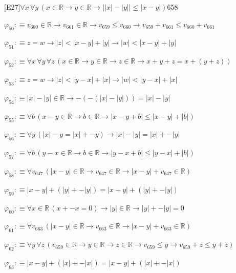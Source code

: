 \begin{fullproof}{[E27]}{$\forall x\,\forall y\,(x \in \mathbb{R} \to y \in \mathbb{R} \to \lvert \lvert x \rvert - \lvert y \rvert \rvert \leq \lvert x - y \rvert)$}{658}
\begin{abbrevlist}
\item $\varphi_{50} :\equiv v_{660} \in \mathbb{R} \to v_{661} \in \mathbb{R} \to v_{659} \leq v_{660} \to v_{659} + v_{661} \leq v_{660} + v_{661}$
\item $\varphi_{51} :\equiv z = w \to \lvert z \rvert < \lvert x - y \rvert + \lvert y \rvert \to \lvert w \rvert < \lvert x - y \rvert + \lvert y \rvert$
\item $\varphi_{52} :\equiv \forall x\,\forall y\,\forall z\,(x \in \mathbb{R} \to y \in \mathbb{R} \to z \in \mathbb{R} \to x + y + z = x + (y + z))$
\item $\varphi_{53} :\equiv z = w \to \lvert z \rvert < \lvert y - x \rvert + \lvert x \rvert \to \lvert w \rvert < \lvert y - x \rvert + \lvert x \rvert$
\item $\varphi_{54} :\equiv \lvert x \rvert - \lvert y \rvert \in \mathbb{R} \to -(-(\lvert x \rvert - \lvert y \rvert)) = \lvert x \rvert - \lvert y \rvert$
\item $\varphi_{55} :\equiv \forall b\,(x - y \in \mathbb{R} \to b \in \mathbb{R} \to \lvert x - y + b \rvert \leq \lvert x - y \rvert + \lvert b \rvert)$
\item $\varphi_{56} :\equiv \forall y\,(\lvert x \rvert - y = \lvert x \rvert + -y) \to \lvert x \rvert - \lvert y \rvert = \lvert x \rvert + -\lvert y \rvert$
\item $\varphi_{57} :\equiv \forall b\,(y - x \in \mathbb{R} \to b \in \mathbb{R} \to \lvert y - x + b \rvert \leq \lvert y - x \rvert + \lvert b \rvert)$
\item $\varphi_{58} :\equiv \forall v_{647}\,(\lvert x - y \rvert \in \mathbb{R} \to v_{647} \in \mathbb{R} \to \lvert x - y \rvert + v_{647} \in \mathbb{R})$
\item $\varphi_{59} :\equiv \lvert x - y \rvert + (\lvert y \rvert + -\lvert y \rvert) = \lvert x - y \rvert + (\lvert y \rvert + -\lvert y \rvert)$
\item $\varphi_{60} :\equiv \forall x \in \mathbb{R}\,(x + -x = 0) \to \lvert y \rvert \in \mathbb{R} \to \lvert y \rvert + -\lvert y \rvert = 0$
\item $\varphi_{61} :\equiv \forall v_{663}\,(\lvert x - y \rvert \in \mathbb{R} \to v_{663} \in \mathbb{R} \to \lvert x - y \rvert + v_{663} \in \mathbb{R})$
\item $\varphi_{62} :\equiv \forall y\,\forall z\,(v_{659} \in \mathbb{R} \to y \in \mathbb{R} \to z \in \mathbb{R} \to v_{659} \leq y \to v_{659} + z \leq y + z)$
\item $\varphi_{63} :\equiv \lvert x - y \rvert + (\lvert x \rvert + -\lvert x \rvert) = \lvert x - y \rvert + (\lvert x \rvert + -\lvert x \rvert)$

\end{abbrevlist}
\end{fullproof}
